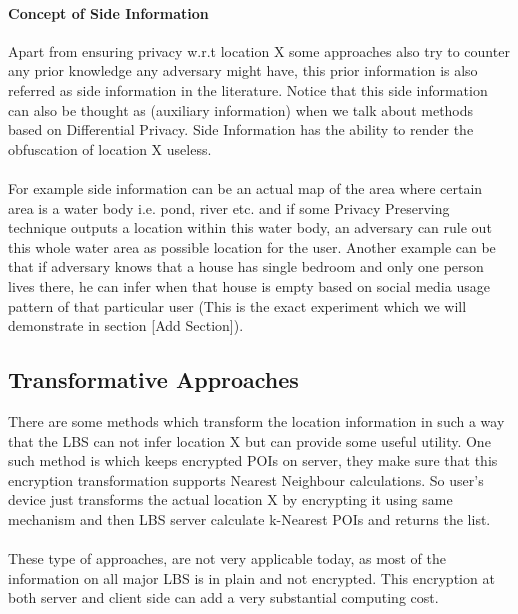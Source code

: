 \documentclass[12pt]{report}
\begin{document}
\paragraph{Concept of Side Information}
Apart from ensuring privacy w.r.t location X some approaches also try to counter any prior knowledge any adversary might have, this prior information is also referred as side information in the literature. Notice that this side information can also be thought as (auxiliary information) when we talk about methods based on Differential Privacy. Side Information has the ability to render the obfuscation of location X useless. 


\paragraph{}
For example side information can be an actual map of the area where certain area is a water body i.e. pond, river etc. and if some Privacy Preserving technique outputs a location within this water body, an adversary can rule out this whole water area as possible location for the user. Another example can be that if adversary knows that a house has single bedroom and only one person lives there, he can infer when that house is empty based on social media usage pattern of that particular user (This is the exact experiment which we will demonstrate in section [Add Section]).

\subsection{Transformative Approaches}
There are some methods which transform the location information in such a way that the LBS can not infer location X but can provide some useful utility. One such method is \cite{khoshgozaran2007blind} which keeps encrypted POIs on server, they make sure that this encryption transformation supports Nearest Neighbour calculations. So user's device just transforms the actual location X by encrypting it using same mechanism and then LBS server calculate k-Nearest POIs and returns the list.

\paragraph{}
These type of approaches, are not very applicable today, as most of the information on all major LBS is in plain and not encrypted. This encryption at both server and client side can add a very substantial computing cost.
\end{document}
